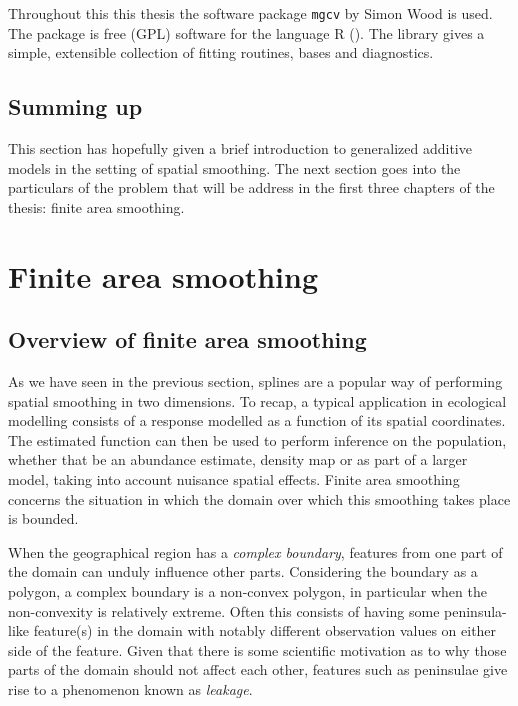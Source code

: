 Throughout this this thesis the software package \texttt{mgcv} by Simon Wood is used. The package is free (GPL) software for the language \textsf{R} (\cite{Rsoftware}). The library gives a simple, extensible collection of fitting routines, bases and diagnostics.


\subsection{Summing up}

This section has hopefully given a brief introduction to generalized additive models in the setting of spatial smoothing. The next section goes into the particulars of the problem that will be address in the first three chapters of the thesis: finite area smoothing.


\section{Finite area smoothing}
\label{intro-FAS}

\subsection{Overview of finite area smoothing}

As we have seen in the previous section, splines are a popular way of performing spatial smoothing in two dimensions. To recap, a typical application in ecological modelling consists of a response modelled as a function of its spatial coordinates. The estimated function can then be used to perform inference on the population, whether that be an abundance estimate, density map or as part of a larger model, taking into account nuisance spatial effects. Finite area smoothing concerns the situation in which the domain over which this smoothing takes place is bounded.

When the geographical region has a \emph{complex boundary}, features from one part of the domain can unduly influence other parts. Considering the boundary as a polygon, a complex boundary is a non-convex polygon, in particular when the non-convexity is relatively extreme. Often this consists of having some peninsula-like feature(s) in the domain with notably different observation values on either side of the feature. Given that there is some scientific motivation as to why those parts of the domain should not affect each other, features such as peninsulae give rise to a phenomenon known as \emph{leakage}.

